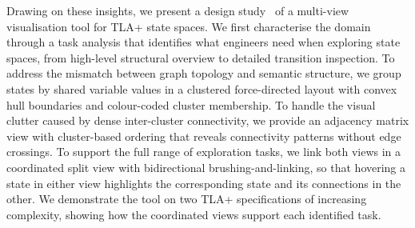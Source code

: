 \documentclass[conference]{IEEEtran}
\begin{document}


Drawing on these insights, we present a design study~\cite{sedlmair2012design} of a multi-view visualisation tool for TLA+ state spaces. We first characterise the domain through a task analysis \cite{OBIE2020100961} that identifies what engineers need when exploring state spaces, from high-level structural overview to detailed transition inspection. To address the mismatch between graph topology and semantic structure, we group states by shared variable values in a clustered force-directed layout with convex hull boundaries and colour-coded cluster membership. To handle the visual clutter caused by dense inter-cluster connectivity, we provide an adjacency matrix view with cluster-based ordering that reveals connectivity patterns without edge crossings. To support the full range of exploration tasks, we link both views in a coordinated split view with bidirectional brushing-and-linking, so that hovering a state in either view highlights the corresponding state and its connections in the other. We demonstrate the tool on two TLA+ specifications of increasing complexity, showing how the coordinated views support each identified task.
\end{document}
